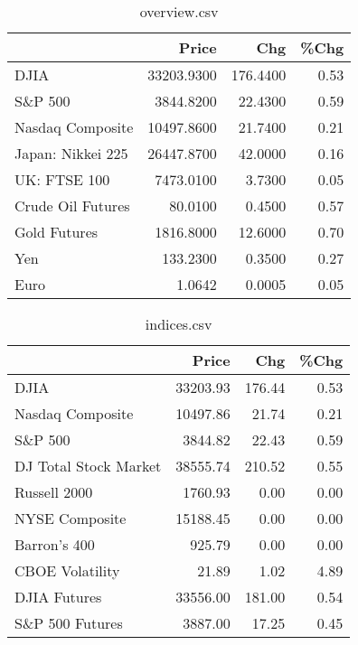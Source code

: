 \documentclass{article}%
\begin{document}
\begin{table}[htbp]%
\caption{overview.csv}%
\centering%
\begin{adjustbox}{width=1\textwidth}%
\begin{tabular}{lrrr}
\toprule
                  &      Price &      Chg &  \%Chg \\
\midrule
             DJIA & 33203.9300 & 176.4400 &  0.53 \\
          S\&P 500 &  3844.8200 &  22.4300 &  0.59 \\
 Nasdaq Composite & 10497.8600 &  21.7400 &  0.21 \\
Japan: Nikkei 225 & 26447.8700 &  42.0000 &  0.16 \\
     UK: FTSE 100 &  7473.0100 &   3.7300 &  0.05 \\
Crude Oil Futures &    80.0100 &   0.4500 &  0.57 \\
     Gold Futures &  1816.8000 &  12.6000 &  0.70 \\
              Yen &   133.2300 &   0.3500 &  0.27 \\
             Euro &     1.0642 &   0.0005 &  0.05 \\
\bottomrule
\end{tabular}
%
\end{adjustbox}%
\end{table}

%


\begin{table}[htbp]%
\caption{indices.csv}%
\centering%
\begin{adjustbox}{width=1\textwidth}%
\begin{tabular}{lrrr}
\toprule
                      &    Price &    Chg &  \%Chg \\
\midrule
                 DJIA & 33203.93 & 176.44 &  0.53 \\
     Nasdaq Composite & 10497.86 &  21.74 &  0.21 \\
              S\&P 500 &  3844.82 &  22.43 &  0.59 \\
DJ Total Stock Market & 38555.74 & 210.52 &  0.55 \\
         Russell 2000 &  1760.93 &   0.00 &  0.00 \\
       NYSE Composite & 15188.45 &   0.00 &  0.00 \\
         Barron's 400 &   925.79 &   0.00 &  0.00 \\
      CBOE Volatility &    21.89 &   1.02 &  4.89 \\
         DJIA Futures & 33556.00 & 181.00 &  0.54 \\
      S\&P 500 Futures &  3887.00 &  17.25 &  0.45 \\
\bottomrule
\end{tabular}
%
\end{adjustbox}%
\end{table}
\end{document}

